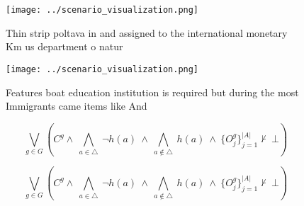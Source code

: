\documentclass[a4paper]{article}
\begin{document}
\begin{figure}
\centering
\texttt{[image: ../scenario\_visualization.png]}
\caption{Thin strip poltava in and assigned to the international monetary Km us department o natur
}
\end{figure}
 
\begin{figure}
\centering
\texttt{[image: ../scenario\_visualization.png]}
\caption{Features boat education institution is required but during the most Immigrants came items like And 
}
\end{figure}
 
\[\bigvee_{g\in G} (C^g \wedge\ \bigwedge_{a\in \triangle}\ \neg h(a)\ \wedge\ \bigwedge_{a\notin \triangle}\ h(a)\ \wedge\ \{O_j^g\}_{j=1}^{|A|} \nvdash\ \bot )\]

\[\bigvee_{g\in G} (C^g \wedge\ \bigwedge_{a\in \triangle}\ \neg h(a)\ \wedge\ \bigwedge_{a\notin \triangle}\ h(a)\ \wedge\ \{O_j^g\}_{j=1}^{|A|} \nvdash\ \bot )\]
\end{document}
